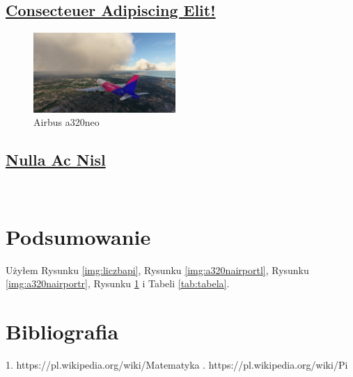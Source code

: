 \documentclass[]{article}
\begin{document}
\newpage
    \subsection{\underline{Consecteuer Adipiscing Elit!}}
    \lipsum[15-19]
   
\begin{figure}
  \centering
  \includegraphics[width=0.48\textwidth]{landing.png}
  \caption{Airbus a320neo}
  \label{img:a320n}
\end{figure}

\newpage
    \subsection{\underline{Nulla Ac Nisl}}
    \lipsum[20-22] \\

\newpage

\section{Podsumowanie}
Użyłem Rysunku \ref{img:liczbapi}, Rysunku \ref{img:a320nairportl}, Rysunku \ref{img:a320nairportr}, Rysunku \ref{img:a320n} i Tabeli \ref{tab:tabela}.



\section{Bibliografia}
1.  https://pl.wikipedia.org/wiki/Matematyka
.  https://pl.wikipedia.org/wiki/Pi
\newline

\cite{art1, art2, book1, conf1, unpub1, manual1}
\nocite{*}
\printbibliography





\printbibliography
\end{document}
